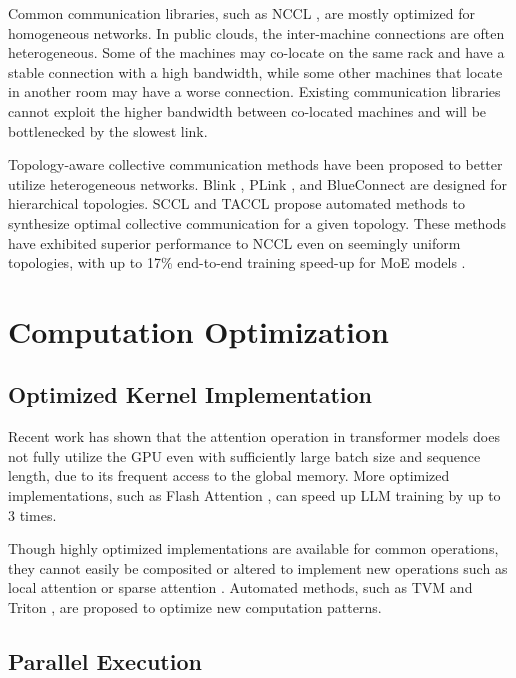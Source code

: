 \documentclass[a4paper, 11pt]{article}
\begin{document}
    Common communication libraries, such as NCCL \cite{nccl}, are mostly optimized for homogeneous networks. In public
    clouds, the inter-machine connections are often heterogeneous. Some of the machines may co-locate on the same rack
    and have a stable connection with a high bandwidth, while some other machines that locate in another room may have
    a worse connection. Existing communication libraries cannot exploit the higher bandwidth between co-located machines
    and will be bottlenecked by the slowest link.

    Topology-aware collective communication methods have been proposed to better utilize heterogeneous networks.
    Blink \cite{blink}, PLink \cite{plink}, and BlueConnect \cite{blueconnect} are designed for hierarchical topologies.
    SCCL \cite{sccl} and TACCL \cite{taccl} propose automated methods to synthesize optimal collective communication for
    a given topology. These methods have exhibited superior performance to NCCL even on seemingly uniform topologies,
    with up to 17\% end-to-end training speed-up for MoE models \cite{taccl}.

    \section{Computation Optimization}

    \subsection{Optimized Kernel Implementation}

    Recent work \cite{flashattention2} has shown that the attention operation in transformer models does not fully
    utilize the GPU even with sufficiently large batch size and sequence length, due to its frequent access to the
    global memory. More optimized implementations, such as Flash Attention \cite{flashattention}, can speed up LLM
    training by up to 3 times.

    Though highly optimized implementations are available for common operations, they cannot easily be composited or
    altered to implement new operations such as local attention \cite{longformer} or sparse attention
    \cite{sparsetransformer}. Automated methods, such as TVM \cite{tvm} and Triton \cite{triton}, are proposed to
    optimize new computation patterns.

    \subsection{Parallel Execution}
\end{document}
